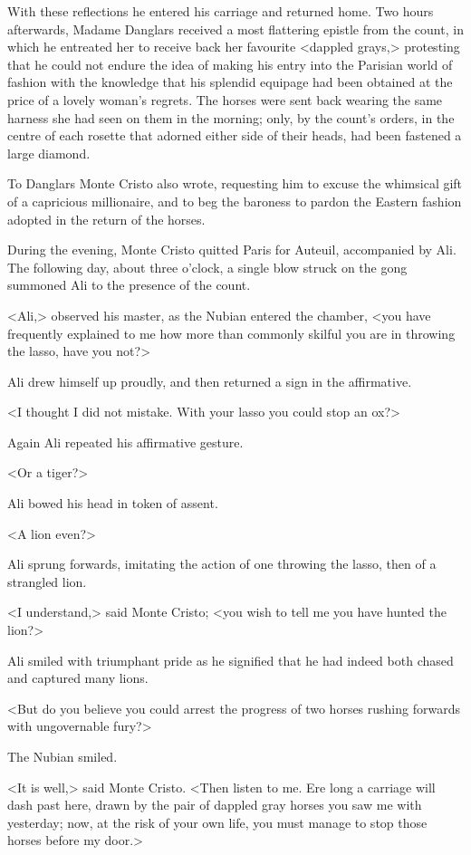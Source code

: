  With these reflections he entered his carriage and returned home. Two hours afterwards, Madame Danglars received a most flattering epistle from the count, in which he entreated her to receive back her favourite <dappled grays,> protesting that he could not endure the idea of making his entry into the Parisian world of fashion with the knowledge that his splendid equipage had been obtained at the price of a lovely woman's regrets. The horses were sent back wearing the same harness she had seen on them in the morning; only, by the count's orders, in the centre of each rosette that adorned either side of their heads, had been fastened a large diamond. 

 To Danglars Monte Cristo also wrote, requesting him to excuse the whimsical gift of a capricious millionaire, and to beg the baroness to pardon the Eastern fashion adopted in the return of the horses. 

 During the evening, Monte Cristo quitted Paris for Auteuil, accompanied by Ali. The following day, about three o'clock, a single blow struck on the gong summoned Ali to the presence of the count. 

 <Ali,> observed his master, as the Nubian entered the chamber, <you have frequently explained to me how more than commonly skilful you are in throwing the lasso, have you not?> 

 Ali drew himself up proudly, and then returned a sign in the affirmative. 

 <I thought I did not mistake. With your lasso you could stop an ox?> 

 Again Ali repeated his affirmative gesture. 

 <Or a tiger?> 

 Ali bowed his head in token of assent. 

 <A lion even?> 

 Ali sprung forwards, imitating the action of one throwing the lasso, then of a strangled lion. 

 <I understand,> said Monte Cristo; <you wish to tell me you have hunted the lion?> 

 Ali smiled with triumphant pride as he signified that he had indeed both chased and captured many lions. 

 <But do you believe you could arrest the progress of two horses rushing forwards with ungovernable fury?> 

 The Nubian smiled. 

 <It is well,> said Monte Cristo. <Then listen to me. Ere long a carriage will dash past here, drawn by the pair of dappled gray horses you saw me with yesterday; now, at the risk of your own life, you must manage to stop those horses before my door.> 

